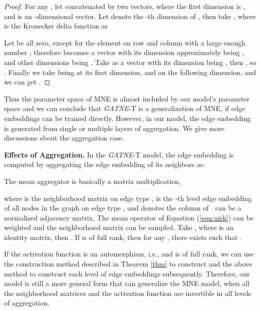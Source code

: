\documentclass[sigconf]{acmart}
\newcommand{\model}{{\em GATNE}}
\newcommand{\hide}[1]{} \newcommand{\jie}[1]{\textbf{\color{red}[(JT: #1 )]}}  \newcommand{\vpara}[1]{\vspace{0.07in}\noindent\textbf{#1 }}
\begin{document}
\begin{proof}
For any , let  concatenated by two vectors, where the first  dimension is , and  is an -dimensional vector. 
Let  denote the -th dimension of , then take , where  is the Kronecker delta function as

Let  be all zero, except for the element on row  and column  with a large enough number ; therefore  becomes a vector with its  dimension approximately being , and other dimensions being . Take  as a vector with its  dimension being ,  then , so .  Finally we take  being  at its first  dimension, and  on the following  dimension, and we can get .
\end{proof}
Thus the parameter space of MNE is almost included by our model's parameter space and we can conclude that \model-T is a generalization of MNE, if edge embeddings can be trained directly. However, in our model, the edge embedding  is generated from single or multiple layers of aggregation. We give more discussions about the aggregation case. \hide{Interested readers are referred to Appendix \ref{extension} for more discussions about the aggregated case.} 

\vpara{Effects of Aggregation.}
In the \model-T model, the edge embedding  is computed by aggregating the edge embedding  of its neighbors as:

The mean aggregator is basically a matrix multiplication,

\noindent where  is the neighborhood matrix on edge type ,  is the -th level edge embedding of all nodes in the graph on edge type , and  denotes the  column of .  can be a normalized adjacency matrix. The mean operator of Equation (\ref{eqn:uirk}) can be weighted and the neighborhood matrix  can be sampled.
Take , where  is an identity matrix, then .
If  is of full rank, then for any , there exists  such that .

If the activation function  is an automorphism, i.e.,  and  is of full rank, we can use the construction method described in Theorem \ref{thm} to construct  and the above method to construct each level of edge embeddings  subsequently. Therefore, our model is still a more general form that can generalize the MNE model, when all the neighborhood matrices  and the activation function  are invertible in all levels of aggregation. 
\end{document}
